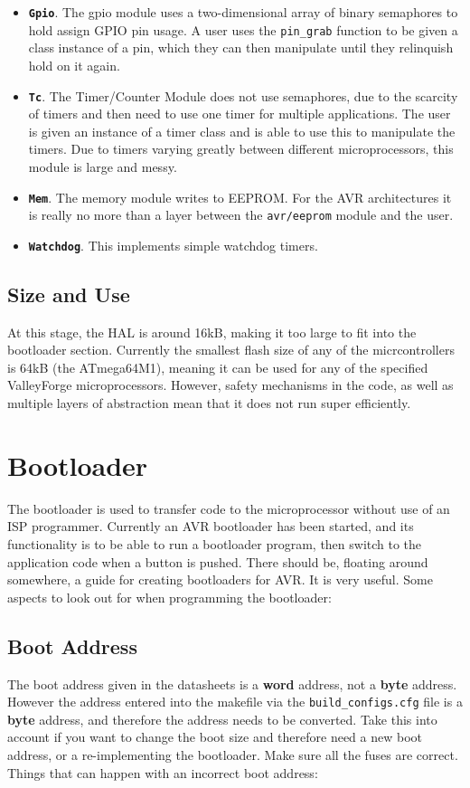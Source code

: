 \documentclass[a4paper, oneside, 11pt, titlepage, onecolumn, openright]{report}
\begin{document}
\begin{itemize}
\item \textbf{\texttt{Gpio}}. The gpio module uses a two-dimensional array of binary semaphores to hold assign GPIO pin usage. A user uses the \texttt{pin\_grab} function to be given a class instance of a pin, which they can then manipulate until they relinquish hold on it again. 
\item \textbf{\texttt{Tc}}. The Timer/Counter Module does not use semaphores, due to the scarcity of timers and then need to use one timer for multiple applications. The user is given an instance of a timer class and is able to use this to manipulate the timers. Due to timers varying greatly between different microprocessors, this module is large and messy.
\item \textbf{\texttt{Mem}}. The memory module writes to EEPROM. For the AVR architectures it is really no more than a layer between the \texttt{avr/eeprom} module and the user.
\item \textbf{\texttt{Watchdog}}. This implements simple watchdog timers.
\end{itemize}			

\section{Size and Use}
			\label{s:HALSizeAndUse}
			At this stage, the HAL is around 16kB, making it too large to fit into the bootloader section. Currently the smallest flash size of any of the micrcontrollers is 64kB (the ATmega64M1), meaning it can be used for any of the specified ValleyForge microprocessors. However, safety mechanisms in the code, as well as multiple layers of abstraction mean that it does not run super efficiently.		
						
\chapter{Bootloader}
			\label{C:Bootloader}
			The bootloader is used to transfer code to the microprocessor without use of an ISP programmer. Currently an AVR bootloader has been started, and its functionality is to be able to run a bootloader program, then switch to the application code when a button is pushed.
			There should be, floating around somewhere, a guide for creating bootloaders for AVR. It is very useful. 			 
			Some aspects to look out for when programming the bootloader:
			
\section{Boot Address}
			\label{s:BootloaderBootAddress}
The boot address given in the datasheets is a \textbf{word} address, not a \textbf{byte} address. However the address entered into the makefile via the \texttt{build\_configs.cfg} file is a \textbf{byte} address, and therefore the address needs to be converted. Take this into account if you want to change the boot size and therefore need a new boot address, or a re-implementing the bootloader. Make sure all the fuses are correct. Things that can happen with an incorrect boot address:
\end{document}
